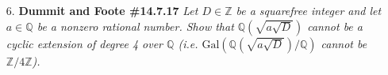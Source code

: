 \documentclass[12pt]{article}
\newcommand{\Z}{\mathbb{Z}}
\newcommand{\Q}{\mathbb{Q}}
\newcommand{\Gal}{\text{Gal}}
\begin{document}
\begin{enumerate}
\item[6.] \textbf{Dummit and Foote \#14.7.17} \textit{Let $D\in \Z$ be a squarefree integer and let $a\in \Q$ be a nonzero rational number. Show that $\Q(\sqrt{a\sqrt{D}})$ cannot be a cyclic extension of degree 4 over $\Q$ (i.e. $\Gal(\Q(\sqrt{a\sqrt{D}})/\Q)$ cannot be $\Z/4\Z$).}

\end{enumerate}
\end{document}
